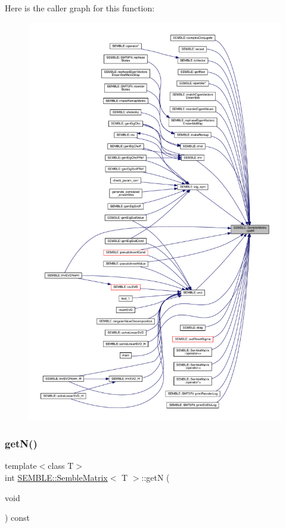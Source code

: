 Here is the caller graph for this function\+:
\nopagebreak
\begin{figure}[H]
\begin{center}
\leavevmode
\includegraphics[width=350pt]{df/d87/structSEMBLE_1_1SembleMatrix_a26d2ee5bf9ad9cb0fdd30bce5abadf92_icgraph}
\end{center}
\end{figure}
\mbox{\label{structSEMBLE_1_1SembleMatrix_a08e062d74d9de22f303e1ab957eb77f2}} 
\subsubsection{\texorpdfstring{getN()}{getN()}\hspace{0.1cm}{\footnotesize\ttfamily [1/2]}}
{\footnotesize\ttfamily template$<$class T$>$ \\
int \mbox{\hyperlink{structSEMBLE_1_1SembleMatrix}{S\+E\+M\+B\+L\+E\+::\+Semble\+Matrix}}$<$ T $>$\+::getN (\begin{DoxyParamCaption}\item[{void}]{ }\end{DoxyParamCaption}) const\hspace{0.3cm}{\ttfamily [inline]}}

